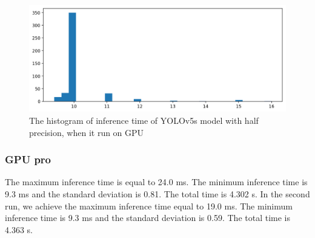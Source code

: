 \documentclass[12pt,a4paper]{article}
\begin{document}
\begin{figure}[H]
    \centering
    \includegraphics[width=15cm]{figures/GPU_infTime_half_hist.png}
    \caption{The histogram of inference time of YOLOv5s model with half precision, when it run on GPU}
    \label{fig: gpu_half_hist}
\end{figure}
\subsubsection*{GPU pro}
The maximum inference time is equal to 24.0 ms. The minimum inference time is 9.3 ms and the standard deviation is 0.81. The total time is 4.302 s. In the second run, we achieve the maximum inference time equal to 19.0 ms. The minimum inference time is 9.3 ms and the standard deviation is 0.59. The total time is 4.363 s.
\end{document}

